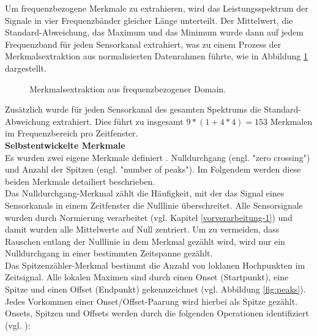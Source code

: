 Um frequenzbezogene Merkmale zu extrahieren, wird das Leistungsspektrum der Signale in vier Frequenzbänder gleicher Länge unterteilt.
Der Mittelwert, die Standard-Abweichung, das Maximum und das Minimum wurde dann auf jedem Frequenzband für jeden Sensorkanal extrahiert, was zu einem Prozess der Merkmalsextraktion aus normalisierten Datenrahmen führte, wie in Abbildung \ref{fig:fft} dargestellt. 

\begin{figure}[h] 
\caption[Merkmalsextraktion aus frequenzbezogener Domain]{ Merkmalsextraktion aus frequenzbezogener Domain. } 
\label{fig:fft} \end{figure} \vspace{0.5cm}


Zusätzlich wurde für jeden Sensorkanal des gesamten Spektrums die Standard-Abweichung  extrahiert. Dies führt zu insgesamt $9 \ast (1 + 4 \ast 4) = 153$ Merkmalen im Frequenzbereich pro Zeitfenster. \\


\textbf{Selbstentwickelte Merkmale \\}
Es wurden zwei eigene Merkmale definiert \cite{bscpiet}. Nulldurchgang (engl. "zero crossing") und Anzahl der Spitzen (engl. "number of peaks"). Im Folgendem werden diese beiden Merkmale detailiert beschrieben. \\

Das Nulldurchgang-Merkmal zählt die Häufigkeit, mit der das Signal eines Sensorkanals in einem Zeitfenster die Nulllinie überschreitet.
Alle Sensorsignale wurden durch Normierung verarbeitet (vgl. Kapitel \ref{vorverarbeitung-1}) und damit wurden alle Mittelwerte auf Null zentriert.
Um zu vermeiden, dass Rauschen entlang der Nulllinie in dem Merkmal gezählt wird, wird nur ein Nulldurchgang in einer bestimmten Zeitspanne gezählt. \\


Das Spitzenzähler-Merkmal bestimmt die Anzahl von loklanen Hochpunkten im Zeitsignal.
Alle lokalen Maximen sind durch einen Onset (Startpunkt), eine Spitze und einen Offset (Endpunkt) gekennzeichnet (vgl. Abbildung \ref{fig:peaks}). 
Jedes Vorkommen einer Onset/Offset-Paarung wird hierbei als Spitze gezählt.
Onsets, Spitzen und Offsets werden durch die folgenden Operationen identifiziert (vgl. \cite{bscGouverneur}):

